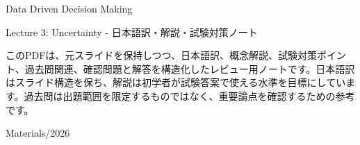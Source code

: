 \documentclass[a4paper,10pt]{article}
\begin{document}
\begin{titlepage}
\centering
\vspace*{2cm}
{\Huge Data Driven Decision Making\par}
\vspace{0.5cm}
{\Large Lecture 3: Uncertainty - 日本語訳・解説・試験対策ノート\par}
\vspace{1cm}
\begin{minipage}{0.88\textwidth}
このPDFは、元スライドを保持しつつ、日本語訳、概念解説、試験対策ポイント、過去問関連、確認問題と解答を構造化したレビュー用ノートです。日本語訳はスライド構造を保ち、解説は初学者が試験答案で使える水準を目標にしています。過去問は出題範囲を限定するものではなく、重要論点を確認するための参考です。
\end{minipage}
\vfill
{\large Materials/2026}\par
\end{titlepage}
\tableofcontents
\clearpage

\end{document}
